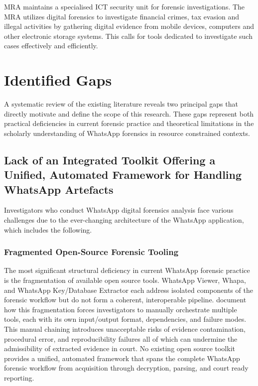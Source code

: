 \documentclass[12pt,a4paper]{report}
\begin{document}
MRA maintains a specialised ICT security unit for forensic investigations. The MRA utilizes digital forensics to investigate financial crimes, tax evasion and illegal activities by gathering digital evidence from mobile devices, computers and other electronic storage systems. This calls for tools dedicated to investigate such cases effectively and efficiently.


\section{Identified Gaps}

A systematic review of the existing literature reveals two principal gaps that directly motivate and define the scope of this research. These gaps represent both practical deficiencies in current forensic practice and theoretical limitations in the scholarly understanding of WhatsApp forensics in resource constrained contexts.

\subsection{Lack of an Integrated Toolkit Offering a Unified, Automated Framework for Handling WhatsApp Artefacts}

Investigators who conduct WhatsApp digital forensics analysis face various challenges due to the ever-changing architecture of the WhatsApp application, which includes the following.

\subsubsection{Fragmented Open-Source Forensic Tooling}

The most significant structural deficiency in current WhatsApp forensic practice is the fragmentation of available open source tools. WhatsApp Viewer, Whapa, and WhatsApp Key/Database Extractor each address isolated components of the forensic workflow but do not form a coherent, interoperable pipeline. \citet{tusharanshu2023} document how this fragmentation forces investigators to manually orchestrate multiple tools, each with its own input/output format, dependencies, and failure modes. This manual chaining introduces unacceptable risks of evidence contamination, procedural error, and reproducibility failures all of which can undermine the admissibility of extracted evidence in court. No existing open source toolkit provides a unified, automated framework that spans the complete WhatsApp forensic workflow from acquisition through decryption, parsing, and court ready reporting.
\end{document}
